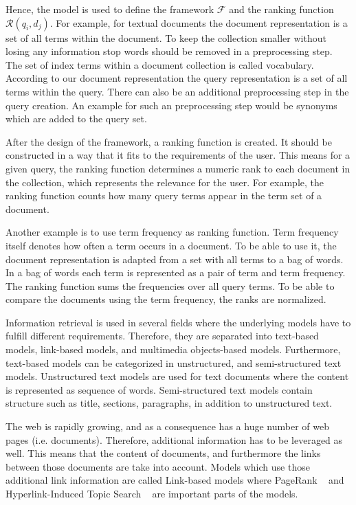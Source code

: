 Hence, the model is used to define the framework $\mathcal{F}$ and the ranking function $\mathcal{R}(q_i, d_j)$. For example, for textual documents the document representation is a set of all terms within the document. To keep the collection smaller without losing any information stop words should be removed in a preprocessing step. The set of index terms within a document collection is called vocabulary. According to our document representation the query representation is a set of all terms within the query. There can also be an additional preprocessing step in the query creation. An example for such an preprocessing step would be synonyms which are added to the query set.

After the design of the framework, a ranking function is created. It should be constructed in a way that it fits to the requirements of the user. This means for a given query, the ranking function determines a numeric rank to each document in the collection, which represents the relevance for the user. For example, the ranking function counts how many query terms appear in the term set of a document.

Another example is to use term frequency as ranking function. Term frequency itself denotes how often a term occurs in a document. To be able to use it, the document representation is adapted from a set with all terms to a bag of words. In a bag of words each term is represented as a pair of term and term frequency. The ranking function sums the frequencies over all query terms. To be able to compare the documents using the term frequency, the ranks are normalized.

Information retrieval is used in several fields where the underlying models have to fulfill different requirements. Therefore, they are separated into text-based models, link-based models, and multimedia objects-based models. Furthermore, text-based models can be categorized in unstructured, and semi-structured text models. Unstructured text models are used for text documents where the content is represented as sequence of words. Semi-structured text models contain structure such as title, sections, paragraphs, in addition to unstructured text.

The web is rapidly growing, and as a consequence has a huge number of web pages (i.e. documents). Therefore, additional information has to be leveraged as well. This means that the content of documents, and furthermore the links between those documents are take into account. Models which use those additional link information are called Link-based models where PageRank ~\cite{brin1998anatomy} and Hyperlink-Induced Topic Search ~\cite{kleinberg1999authoritative} are important parts of the models.

